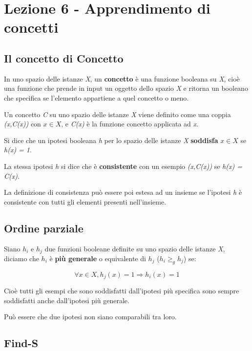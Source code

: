 \section{Lezione 6 - Apprendimento di concetti}\label{lezione-6---apprendimento-di-concetti}

\subsection{Il concetto di Concetto}\label{il-concetto-di-concetto}

In uno spazio delle istanze \emph{X}, un \textbf{concetto} è una
funzione booleana su \emph{X}, cioè una funzione che prende in input un
oggetto dello spazio \emph{X} e ritorna un booleano che specifica se
l'elemento appartiene a quel concetto o meno.

Un concetto \emph{C} su uno spazio delle istanze \emph{X} viene definito
come una coppia \emph{(x,C(x))} con $x \in X$, e \emph{C(x)} è la
funzione concetto applicata ad \emph{x}.

Si dice che un ipotesi booleana \emph{h} per lo spazio delle istanze
\emph{X} \textbf{soddisfa} $x \in X$ se \emph{h(x) = 1}.

La stessa ipotesi \emph{h} si dice che è \textbf{consistente} con un
esempio \emph{(x,C(x))} se \emph{h(x) = C(x)}.

La definizione di consistenza può essere poi estesa ad un insieme se
l'ipotesi \emph{h} è consistente con tutti gli elementi presenti
nell'insieme.

\subsection{Ordine parziale}\label{ordine-parziale}

Siano $h_i$ e $h_j$ due funzioni booleane definite su uno spazio
delle istanze \emph{X}, diciamo che $h_i$ è \textbf{più generale} o
equivalente di $h_j$ ($h_i \geq_g h_j$) se:

$$
\forall x \in X,  h_j(x) = 1 \Rightarrow h_i(x) = 1
$$

Cioè tutti gli esempi che sono soddisfatti dall'ipotesi più specifica
sono sempre soddisfatti anche dall'ipotesi più generale.

Può essere che due ipotesi non siano comparabili tra loro.

\subsection{Find-S}\label{find-s}

